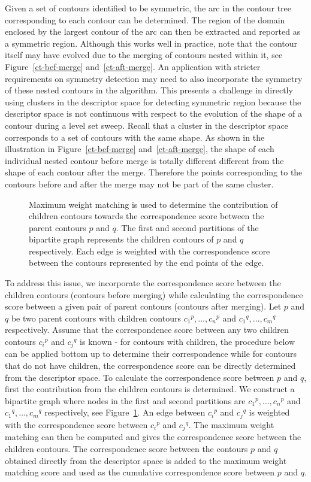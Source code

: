 \documentclass[review,journal]{vgtc}         %
\begin{document}
Given a set of contours identified to be symmetric, the arc in the contour tree 
corresponding to each contour can be determined. The region of the domain
enclosed by the largest contour of the arc can then be extracted and reported
as a symmetric region. Although this works well in practice, note that the contour
itself may have evolved due to the merging of contours nested within it, see Figure~\ref{ct-bef-merge}
and~\ref{ct-aft-merge}.
An application with stricter requirements on symmetry detection may need to
also incorporate the symmetry of these nested contours in the algorithm. 
This presents a challenge in directly using clusters in the descriptor space 
for detecting symmetric region because the descriptor space is not continuous with 
respect to the evolution of the shape of a contour during a level set sweep. 
Recall that a cluster in the descriptor space corresponds to a
set of contours with the same shape. As shown in the illustration in 
Figure~\ref{ct-bef-merge} and~\ref{ct-aft-merge}, the shape of each individual nested contour
before merge is totally different different from the shape of each contour after the merge.
Therefore the points corresponding to the contours before and after the merge may not be
part of the same cluster. 
\begin{figure}[h]
\centering
\scalebox{.15}{}
\caption{\label{bip}Maximum weight matching is used to determine the contribution of children
	contours towards the correspondence score between the parent contours $p$ and $q$. The
	first and second partitions of the bipartite graph represents the children contours of $p$
	and $q$ respectively. Each edge is weighted with the correspondence score between the
	contours represented by the end points of the edge.}
\end{figure}

To address this issue, we incorporate the correspondence score between the children contours 
(contours before merging) while calculating the correspondence score between a given pair
of parent contours (contours after merging). Let $p$ and $q$ be two parent contours
with children contours ${c_1}^p,\dots,{c_n}^p$ and ${c_1}^q,\dots,{c_m}^q$ respectively. 
Assume that the correspondence score between any two
children contours ${c_i}^p$ and ${c_j}^q$ is known - for contours with children,
the procedure below can be applied bottom up to determine their correspondence
while for contours that do not have children, the correspondence score can be directly 
determined from the descriptor space. To calculate the correspondence score
between $p$ and $q$, first the contribution from the children contours 
is determined. We construct a bipartite graph where nodes in the first
and second partitions are ${c_1}^p,\dots,{c_n}^p$ and ${c_1}^q,\dots,{c_m}^q$ 
respectively, see Figure~\ref{bip}. An edge between ${c_i}^p$ and ${c_j}^q$ is weighted
with the correspondence score between ${c_i}^p$ and ${c_j}^q$. The maximum weight
matching can then be computed and gives the correspondence score between the children
contours. The correspondence score between the contours $p$ and $q$ obtained
directly from the descriptor space is added to the maximum weight matching score
and used as the cumulative correspondence score between $p$ and $q$. 
\end{document}
